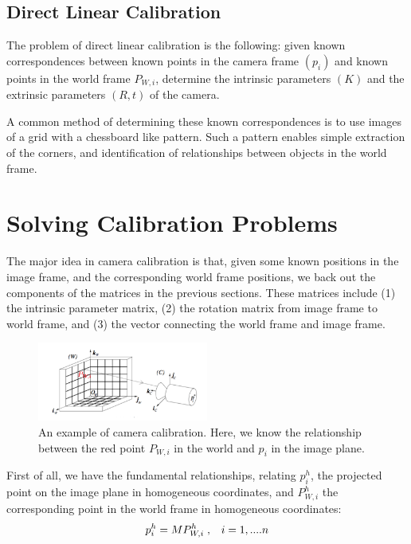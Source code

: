 \documentclass[]{article}
\begin{document}
\subsection{Direct Linear Calibration}
The problem of direct linear calibration is the following: given known correspondences between known points in the camera frame $(p_i)$ and known points in the world frame $P_{W,i}$, determine the intrinsic parameters $(K)$ and the extrinsic parameters $(R,t)$ of the camera.

A common method of determining these known correspondences is to use images of a grid with a chessboard like pattern. Such a pattern enables simple extraction of the corners, and identification of relationships between objects in the world frame.

\section{Solving Calibration Problems}

The major idea in camera calibration is that, given some known positions in the image frame, and the corresponding world frame positions, we back out the components of the matrices in the previous sections. These matrices include (1) the intrinsic parameter matrix, (2) the rotation matrix from image frame to world frame, and (3) the vector connecting the world frame and image frame.\\

\begin{figure}[H]
\includegraphics[width=0.5\textwidth]{vik_image_4.png}
\centering
\caption{An example of camera calibration. Here, we know the relationship between the red point $P_{W,i}$ in the world and $p_i$ in the image plane.}
\label{fig:calibration}
\end{figure}


First of all, we have the fundamental relationships, relating $p_i^h$, the projected point on the image plane in homogeneous coordinates, and $P_{W,i}^h$ the corresponding point in the world frame in homogeneous coordinates:
\begin{equation}
    p_i^h = M P_{W,i}^{h}\hspace{1mm}, \hspace{3mm}i = 1,....n
\end{equation}
\end{document}
